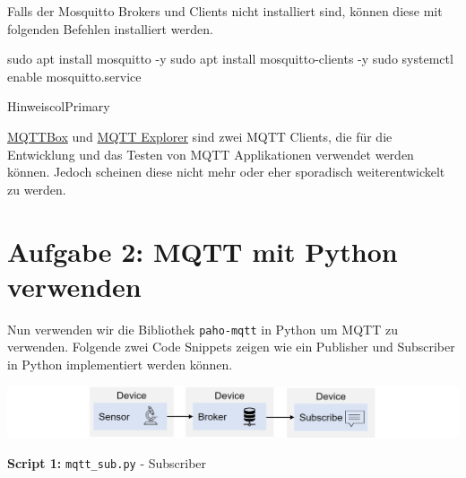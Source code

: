 \documentclass[
  11pt,
  a4paper,
  oneside, openany  ,captions=tableheading
]{scrbook}
\newenvironment{Shaded}{\begin{snugshade}}{\end{snugshade}}
\newcommand{\AttributeTok}[1]{\textcolor[rgb]{0.40,0.45,0.13}{#1}}
\newcommand{\FunctionTok}[1]{\textcolor[rgb]{0.28,0.35,0.67}{#1}}
\newcommand{\NormalTok}[1]{\textcolor[rgb]{0.00,0.23,0.31}{#1}}
\theoremstyle{remark}
\renewcommand{\markright}[1]{\def\chaptertitle{#1}} %
\begin{document}
Falls der Mosquitto Brokers und Clients nicht installiert sind, können
diese mit folgenden Befehlen installiert werden.

\begin{Shaded}
\begin{Highlighting}[]
\FunctionTok{sudo}\NormalTok{ apt install mosquitto }\AttributeTok{{-}y}
\FunctionTok{sudo}\NormalTok{ apt install mosquitto{-}clients }\AttributeTok{{-}y}
\FunctionTok{sudo}\NormalTok{ systemctl enable mosquitto.service}
\end{Highlighting}
\end{Shaded}

\begin{boxtitle}{Hinweis}{colPrimary}

\href{https://apps.microsoft.com/detail/9NBLGGH55JZG}{MQTTBox} und
\href{https://mqtt-explorer.com}{MQTT Explorer} sind zwei MQTT Clients,
die für die Entwicklung und das Testen von MQTT Applikationen verwendet
werden können. Jedoch scheinen diese nicht mehr oder eher sporadisch
weiterentwickelt zu werden.

\end{boxtitle}

\section*{Aufgabe 2: MQTT mit Python
verwenden}\label{aufgabe-2-mqtt-mit-python-verwenden}

\markright{Aufgabe 2: MQTT mit Python verwenden}

Nun verwenden wir die Bibliothek \texttt{paho-mqtt} in Python um MQTT zu
verwenden. Folgende zwei Code Snippets zeigen wie ein Publisher und
Subscriber in Python implementiert werden können.

\includegraphics{images/mqtt-sensor-subscribe.jpg}

\textbf{Script 1:} \texttt{mqtt\_sub.py} - Subscriber
\end{document}
